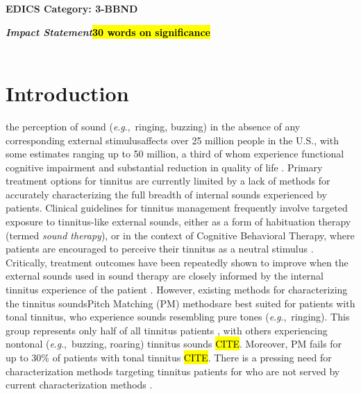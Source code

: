 \documentclass[journal]{IEEEtran}
\newcommand{\eg}{\textit{e}.\textit{g}.,\ }
\begin{document}
\ifCLASSOPTIONpeerreview
\begin{center} \bfseries EDICS Category: 3-BBND \end{center}
\fi
%
\IEEEpeerreviewmaketitle

\begin{minipage}[t]{1\columnwidth}
\textbf{\textit{Impact Statement}\textemdash{}\hl{30 words on significance}}\\
\\
\end{minipage}

\section{Introduction}
\textemdash{}the perception of sound (\eg ringing, buzzing)
in the absence of any corresponding external stimulus\textemdash{}affects over 25 million people in the U.S., with some estimates ranging up to 50 million, a third of whom experience functional cognitive impairment and substantial reduction in quality of life \cite{henryTinnitusEpidemiologicPerspective2020,vajsakovicPrinciplesMethodsPsychoacoustic2021}.
Primary treatment options for tinnitus are currently limited by a lack of methods for accurately characterizing the full breadth of internal sounds experienced by patients.
Clinical guidelines for tinnitus management frequently involve targeted exposure to tinnitus-like external sounds, either as a form of habituation therapy (termed \textit{sound therapy}), or in the context of Cognitive Behavioral Therapy, where patients are encouraged to perceive their tinnitus as a neutral stimulus \cite{jastreboff25YearsTinnitus2015}.
Critically, treatment outcomes have been repeatedly shown to improve when the external sounds used in sound therapy are closely informed by the internal tinnitus experience of the patient
\cite{steinInhibitioninducedPlasticityTinnitus2015,tassCounteractingTinnitusAcoustic2012,okamotoListeningTailormadeNotched2010,davisNeuromonicsTinnitusTreatment2007}.
However, existing methods for characterizing the tinnitus sounds\textemdash{}Pitch Matching (PM) methods\textemdash{}are best suited for patients with tonal tinnitus, who experience sounds resembling pure tones (\eg ringing).
This group represents only half of all tinnitus patients \cite{vajsakovicPrinciplesMethodsPsychoacoustic2021}, with others experiencing nontonal (\eg buzzing, roaring) tinnitus sounds \hl{CITE}.
Moreover, PM fails for up to 30\% of patients with tonal tinnitus \hl{CITE}.
There is a pressing need for characterization methods targeting tinnitus patients for who are not served by current characterization methods \cite{henryTinnitusEpidemiologicPerspective2020,henryMeasurementTinnitus2016,norenaPsychoacousticCharacterizationTinnitus2002}.
\end{document}
